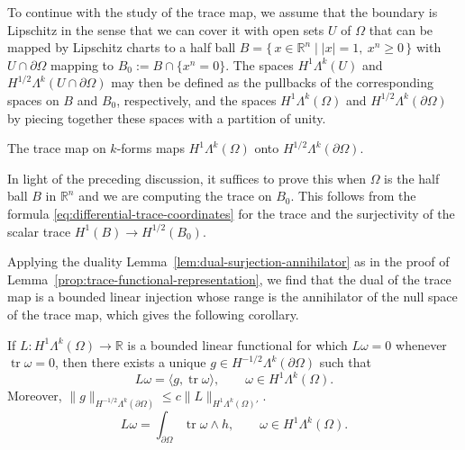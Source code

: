 {To continue with the study of the trace map, we assume that the boundary is Lipschitz in the sense that we can cover it with open sets $U$ of $\Omega$ that can be mapped by Lipschitz charts to a half ball $B=\{\,x\in\mathbb R^n\mid|x|=1,\ x^n\geq0\,\}$ with $U\cap\partial\Omega$ mapping to $B_0:=B\cap\{x^n=0\}$. The spaces $H^1\Lambda^k(U)$ and $H^{1/2}\Lambda^k(U\cap\partial\Omega)$ may then be defined as the pullbacks of the corresponding spaces on $B$ and $B_0$, respectively, and the spaces $H^1\Lambda^k(\Omega)$ and $H^{1/2}\Lambda^k(\partial\Omega)$ by piecing together these spaces with a partition of unity.}

\begin{Theorem}\label{thm:forms-h1-trace-surjectivity}
{The trace map on $k$-forms maps $H^1\Lambda^k(\Omega)$ onto $H^{1/2}\Lambda^k(\partial\Omega)$.}
\end{Theorem}

\begin{Proof}
{In light of the preceding discussion, it suffices to prove this when $\Omega$ is the half ball $B$ in $\mathbb R^n$ and we are computing the trace on $B_0$. This follows from the formula \eqref{eq:differential-trace-coordinates} for the trace and the surjectivity of the scalar trace $H^1(B)\to H^{1/2}(B_0)$.}
\end{Proof}

{Applying the duality Lemma~\ref{lem:dual-surjection-annihilator} as in the proof of Lemma~\ref{prop:trace-functional-representation}, we find that the dual of the trace map is a bounded linear injection whose range is the annihilator of the null space of the trace map, which gives the following corollary.}

\begin{Corollary}\label{cor:forms-trace-functional-representation}
{If $L:H^1\Lambda^k(\Omega)\to\mathbb R$ is a bounded linear functional for which $L\omega=0$ whenever $\operatorname{tr}\omega=0$, then there exists a unique $g\in H^{-1/2}\Lambda^k(\partial\Omega)$ such that}
\[
L\omega=\langle g,\operatorname{tr}\omega\rangle,\qquad\omega\in H^1\Lambda^k(\Omega).
\]
{Moreover, $\|g\|_{H^{-1/2}\Lambda^k(\partial\Omega)}\leq c\|L\|_{H^1\Lambda^k(\Omega)'}$.}
\[
L\omega=\int_{\partial\Omega}\operatorname{tr}\omega\wedge h,\qquad\omega\in H^1\Lambda^k(\Omega).
\]
\end{Corollary}


